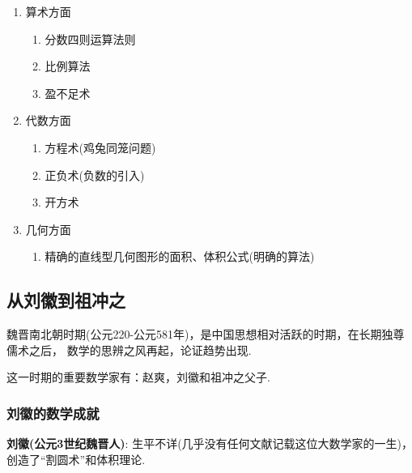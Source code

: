 \documentclass{Math_Note}
\begin{document}
\begin{enumerate}
    \item 算术方面
    \begin{enumerate}
        \item 分数四则运算法则
        \item 比例算法
        \item 盈不足术
    \end{enumerate}
    \item 代数方面
    \begin{enumerate}
        \item 方程术(鸡兔同笼问题)
        \item 正负术(负数的引入)
        \item 开方术
    \end{enumerate}
    \item 几何方面
    \begin{enumerate}
        \item 精确的直线型几何图形的面积、体积公式(明确的算法)
    \end{enumerate}
\end{enumerate}

\subsection{从刘徽到祖冲之}
魏晋南北朝时期(公元220-公元581年)，是中国思想相对活跃的时期，在长期独尊儒术之后，
数学的思辨之风再起，论证趋势出现.

这一时期的重要数学家有：赵爽，刘徽和祖冲之父子.

\subsubsection{刘徽的数学成就}
\textbf{刘徽(公元3世纪魏晋人)}: 生平不详(几乎没有任何文献记载这位大数学家的一生)，创造了“割圆术”和体积理论.
\end{document}
